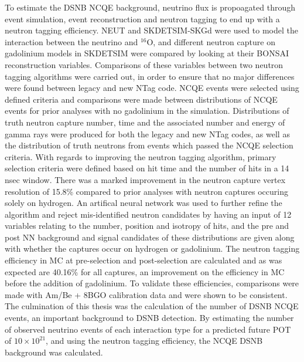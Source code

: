 To estimate the DSNB NCQE background, neutrino flux is propoagated through event simulation, event reconstruction and neutron tagging to end up with a neutron tagging efficiency. NEUT and SKDETSIM-SKGd were used to model the interaction between the neutrino and ${ }^{16} \mathrm{O}$, and different neutron capture on gadolinium models in SKDETSIM were compared by looking at their BONSAI reconstruction variables. Comparisons of these variables between two neutron tagging algorithms were carried out, in order to ensure that no major differences were found between legacy and new NTag code. NCQE events were selected using defined criteria and comparisons were made between distributions of NCQE events for prior analyses with no gadolinium in the simulation. Distributions of truth neutron capture number, time and the associated number and energy of gamma rays were produced for both the legacy and new NTag codes, as well as the distribution of truth neutrons from events which passed the NCQE selection criteria. With regards to improving the neutron tagging algorithm, primary selection criteria were defined based on hit time and the number of hits in a 14 nsec window. There was a marked improvement in the neutron capture vertex resolution of 15.8\% compared to prior analyses with neutron captures occuring solely on hydrogen. An artifical neural network was used to further refine the algorithm and reject mis-identified neutron candidates by having an input of 12 variables relating to the number, position and isotropy of hits, and the pre and post NN background and signal candidates of these distributions are given along with whether the captures occur on hydrogen or gadolinium. The neutron tagging efficiency in MC at pre-selection and post-selection are calculated and as was expected are 40.16\% for all captures, an improvement on the efficiency in MC before the addition of gadolinium. To validate these efficiencies, comparisons were made with Am/Be + 8BGO calibration data and were shown to be consistent.
\newline
The culmination of this thesis was the calculation of the number of DSNB NCQE events, an important background to DSNB detection. By estimating the number of observed neutrino events of each interaction type for a predicted future POT of $10 \times 10^{21}$, and using the neutron tagging efficiency, the NCQE DSNB background was calculated.
